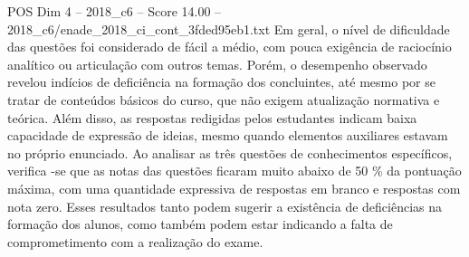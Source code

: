 \begin{textsample}{POS Dim 4 – 2018\_c6 – Score 14.00 – 2018\_c6/enade\_2018\_ci\_cont\_3fded95eb1.txt}
Em geral, o nível de dificuldade das questões foi considerado de fácil a médio, com pouca exigência de raciocínio analítico ou articulação com outros temas.
Porém, o desempenho observado revelou indícios de deficiência na formação dos concluintes, até mesmo por se tratar de conteúdos básicos do curso, que não exigem atualização normativa e teórica.
Além disso, as respostas redigidas pelos estudantes indicam baixa capacidade de expressão de ideias, mesmo quando elementos auxiliares estavam no próprio enunciado.
Ao analisar as três questões de conhecimentos específicos, verifica -se que as notas das questões ficaram muito abaixo de 50 \% da pontuação máxima, com uma quantidade expressiva de respostas em branco e respostas com nota zero.
Esses resultados tanto podem sugerir a existência de deficiências na formação dos alunos, como também podem estar indicando a falta de comprometimento com a realização do exame.

\end{textsample}
